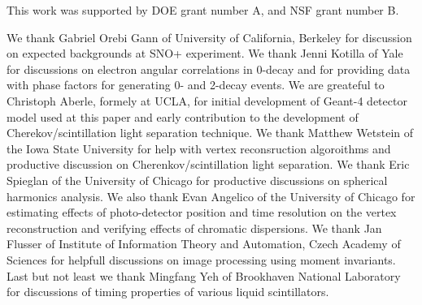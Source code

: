 This work was supported by DOE grant number A, and NSF grant number B.

We thank Gabriel Orebi Gann of University of California, Berkeley for discussion on expected backgrounds at 
SNO+ experiment. We thank Jenni Kotilla of Yale for discussions on electron angular correlations in 0\nbb-decay 
and for providing data with phase factors for generating 0\nbb- and 2\nbb-decay events.
We are greateful to Christoph Aberle, formely at UCLA, for initial development of Geant-4 
detector model used at this paper and early contribution to the development of Cherekov/scintillation
light separation technique. We thank Matthew Wetstein of the Iowa State University for help with vertex reconsruction
algoroithms and productive discussion on Cherenkov/scintillation light separation. We thank Eric Spieglan of the 
University of Chicago for productive discussions on spherical harmonics
analysis. We also thank Evan Angelico of the University of Chicago for estimating effects of photo-detector position and
time resolution on the vertex reconstruction and verifying effects of chromatic dispersions.
We thank Jan Flusser of Institute of Information Theory and Automation, Czech Academy of Sciences for
helpfull discussions on image processing using moment invariants. Last but not least we thank Mingfang Yeh of 
Brookhaven National Laboratory for discussions of timing properties of various liquid scintillators.

